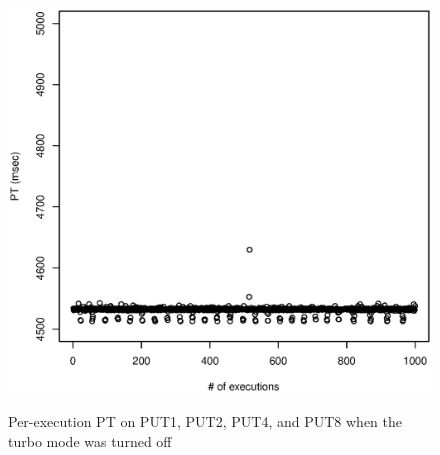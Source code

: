 \documentclass[10pt]{article}
\begin{document}
\begin{figure}[H]
{		\includegraphics[scale=0.43]{figures/sodb8-ntp-on-turbo-off/4_sec_pt_all.eps}
		\label{fig:tm_4_sec_pt_all}
	}
	\caption{Per-execution PT on PUT1, PUT2, PUT4, and PUT8 when the turbo mode was turned off~\label{fig:turbo_off_pt}}
\end{figure}


%
%
\end{document}
